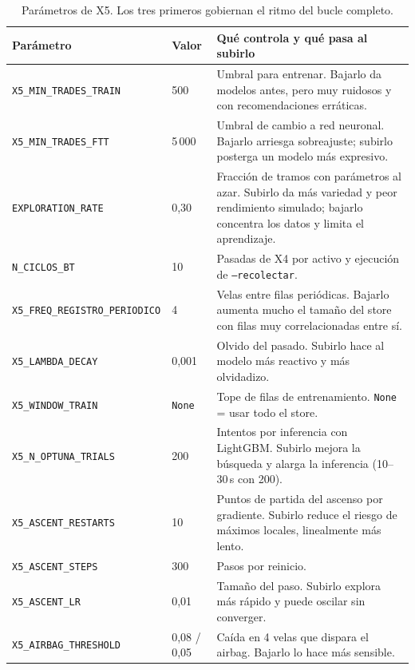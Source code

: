 \documentclass[11pt,a4paper]{article}
\newcommand{\code}[1]{\texttt{\small #1}}
\begin{document}
\begin{table}[h]
\centering
\small
\begin{tabularx}{\linewidth}{@{}l l X@{}}
\toprule
\textbf{Parámetro} & \textbf{Valor} & \textbf{Qué controla y qué pasa al subirlo} \\
\midrule
\code{X5_MIN_TRADES_TRAIN} & 500 & Umbral para entrenar. Bajarlo da modelos antes, pero muy ruidosos y con recomendaciones erráticas. \\
\code{X5_MIN_TRADES_FTT} & 5\,000 & Umbral de cambio a red neuronal. Bajarlo arriesga sobreajuste; subirlo posterga un modelo más expresivo. \\
\code{EXPLORATION_RATE} & 0,30 & Fracción de tramos con parámetros al azar. Subirlo da más variedad y peor rendimiento simulado; bajarlo concentra los datos y limita el aprendizaje. \\
\code{N_CICLOS_BT} & 10 & Pasadas de X4 por activo y ejecución de \code{--recolectar}. \\
\code{X5_FREQ_REGISTRO_PERIODICO} & 4 & Velas entre filas periódicas. Bajarlo aumenta mucho el tamaño del store con filas muy correlacionadas entre sí. \\
\code{X5_LAMBDA_DECAY} & 0,001 & Olvido del pasado. Subirlo hace al modelo más reactivo y más olvidadizo. \\
\code{X5_WINDOW_TRAIN} & \code{None} & Tope de filas de entrenamiento. \code{None} = usar todo el store. \\
\code{X5_N_OPTUNA_TRIALS} & 200 & Intentos por inferencia con LightGBM. Subirlo mejora la búsqueda y alarga la inferencia (10--30\,s con 200). \\
\code{X5_ASCENT_RESTARTS} & 10 & Puntos de partida del ascenso por gradiente. Subirlo reduce el riesgo de máximos locales, linealmente más lento. \\
\code{X5_ASCENT_STEPS} & 300 & Pasos por reinicio. \\
\code{X5_ASCENT_LR} & 0,01 & Tamaño del paso. Subirlo explora más rápido y puede oscilar sin converger. \\
\code{X5_AIRBAG_THRESHOLD} & 0,08 / 0,05 & Caída en 4 velas que dispara el airbag. Bajarlo lo hace más sensible. \\
\bottomrule
\end{tabularx}
\caption{Parámetros de X5. Los tres primeros gobiernan el ritmo del bucle completo.}
\end{table}

\newpage
\end{document}
